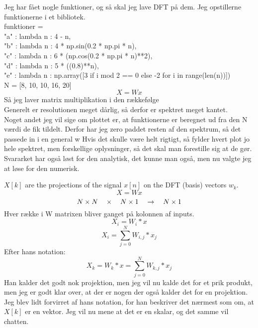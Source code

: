 \begin{Opgaver}
\begin{kapitel}
\begin{Opgave}
\begin{UnderOpgave}
            \end{UnderOpgave}
        \end{Opgave}
        \begin{Opgave}
            Jeg har fået nogle funktioner, og så skal jeg lave DFT på dem. Jeg opstillerne funktionerne i et bibliotek. \\
            funktioner = { \\
                "a" : lambda n : 4 - n, \\
                "b" : lambda n : 4 * np.sin(0.2 * np.pi * n), \\
                "c" : lambda n : 6 * (np.cos(0.2 * np.pi * n)**2), \\
                "d" : lambda n : 5 * ((0.8)**n), \\
                "e" : lambda n : np.array([3 if i mod 2 == 0 else -2 for i in range(len(n))]) \\
            } 
            N = [8, 10, 10, 16, 20]
            \[X = Wx\]
            Så jeg laver matrix multiplikation i den rækkefølge
            \\
            Generelt er resolutionen meget dårlig, så derfor er spektret meget kantet.\\
            Noget andet jeg vil sige om plottet er, at funktionerne er beregnet ud fra den N værdi de fik tildelt. Derfor har jeg zero paddet resten af den spektrum, så det passede in i en general w
            Hvis det skulle være helt rigtigt, så fylder hvert plot jo hele spektret, men forskellige oplysninger, så det skal man forestille sig at de gør.\\
            Svararket har også løst for den analytisk, det kunne man også, men nu valgte jeg at løse for den numerisk. 
        \end{Opgave}
        \begin{Opgave}
            $X[k]$ are the projections of the signal $x[n]$ on the DFT (basis) vectors $w_k$. 
            \[X = Wx\]
            \[N\times N \tab{0} \times \tab{0} N\times 1 \tab{0} \rightarrow \tab{0} N\times 1\]
            Hver række i W matrixen bliver ganget på kolonnen af inputs.
            \[X_i = W_{i} * x\]
            \[X_i = \sum_{j = 0}^{N}W_{i, j} * x_j\]
            Efter hans notation: 
            \[X_k = W_{k} * x = \sum_{j = 0}^{N}W_{k, j} * x_j\]
            Han kalder det godt nok projektion, men jeg vil nu kalde det for et prik produkt, men jeg er godt klar over, at der er nogen der også kalder det for en projektion. 
            Jeg blev lidt forvirret af hans notation, for han beskriver det nærmest som om, at $X[k]$ er en vektor. Jeg vil nu mene at det er en skalar, og det samme vil chatten.            
            

\end{Opgave}
\end{kapitel}
\end{Opgaver}
